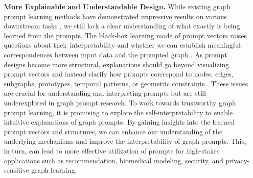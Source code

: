 \textbf{More Explainable and Understandable Design. }While existing graph prompt learning methods have demonstrated impressive results on various downstream tasks \cite{guo2023datacentric, wen2023voucher, yang2023empirical}, we still lack a clear understanding of what exactly is being learned from the prompts. The black-box learning mode of prompt vectors raises questions about their interpretability and whether we can establish meaningful correspondences between input data and the prompted graph \cite{sun2023all}. As prompt designs become more structural, explanations should go beyond visualizing prompt vectors and instead clarify how prompts correspond to nodes, edges, subgraphs, prototypes, temporal patterns, or geometric constraints \cite{gong2024selfpro, ge2024psp, fu2025edge, yan2024igap}. These issues are crucial for understanding and interpreting prompts but are still underexplored in graph prompt research. To work towards trustworthy graph prompt learning, it is promising to explore the self-interpretability \cite{dai2021selfexplainable, zhang2021protgnn} to enable intuitive explanations of graph prompts. By gaining insights into the learned prompt vectors and structures, we can enhance our understanding of the underlying mechanisms and improve the interpretability of graph prompts. This, in turn, can lead to more effective utilization of prompts for high-stakes applications such as recommendation, biomedical modeling, security, and privacy-sensitive graph learning.